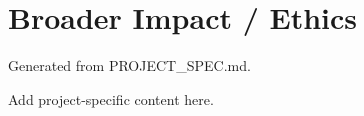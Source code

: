 \section{Broader Impact / Ethics}
Generated from PROJECT_SPEC.md.

Add project-specific content here.

